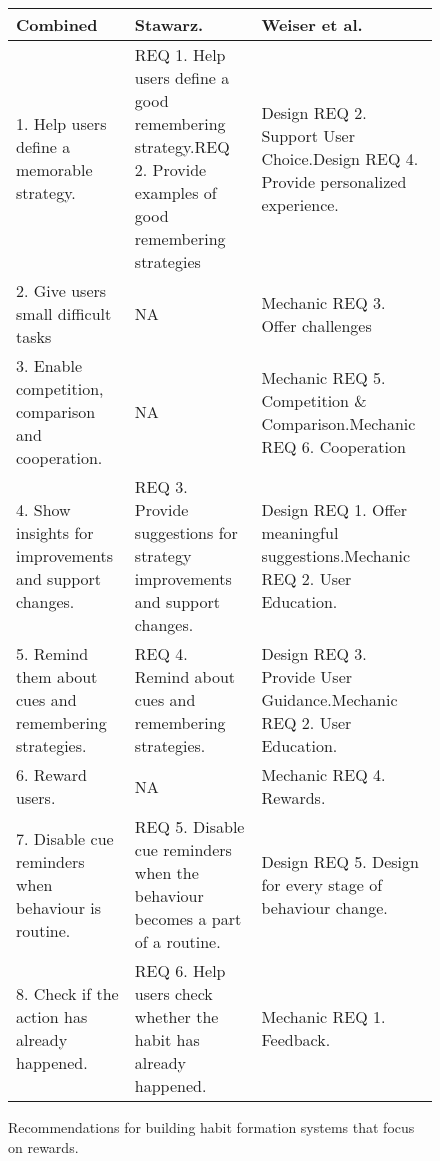 \begin{landscape}
\renewcommand{\arraystretch}{1.5} %
\begin{figure}[ht] %


\begin{center}
\begin{tabular}{ |p{7cm}|p{6cm}|p{6.5cm}| }
  \hline
  \textbf{Combined} & \textbf{Stawarz.~\cite{thesis_kathy}} & \textbf{Weiser et al.~\cite{article_taxonomy_motivational_affordances_meaningful}} \\ \hline %
  1. Help users define a memorable strategy. & REQ 1. Help users define a good remembering strategy.\newline REQ 2. Provide examples of good remembering strategies & Design REQ 2. Support User Choice.\newline Design REQ 4. Provide personalized experience. \\ \hline
  2. Give users small difficult tasks & N\/A & Mechanic REQ 3. Offer challenges\\ \hline
  3. Enable competition, comparison and cooperation. & N\/A & Mechanic REQ 5. Competition \& Comparison.\newline Mechanic REQ 6. Cooperation\\ \hline
  4. Show insights for improvements and support changes. & REQ 3. Provide suggestions for strategy improvements and support changes. & Design REQ 1. Offer meaningful suggestions.\newline Mechanic REQ 2. User Education. \\ \hline
  5. Remind them about cues and remembering strategies. & REQ 4. Remind about cues and remembering strategies. & Design REQ 3. Provide User Guidance.\newline Mechanic REQ 2. User Education. \\ \hline
  6. Reward users. & N\/A & Mechanic REQ 4. Rewards. \\ \hline
  7. Disable cue reminders when behaviour is routine. & REQ 5. Disable cue reminders when the behaviour becomes a part of a routine. & Design REQ 5. Design for every stage of behaviour change. \\ \hline
  8. Check if the action has already happened. & REQ 6. Help users check whether the habit has already happened. & Mechanic REQ 1. Feedback. \\ \hline
\end{tabular}
\end{center}

    \caption{Recommendations for building habit formation systems that focus on rewards.}
    \label{fig:reqtable}
\end{figure}
\newpage
\end{landscape}



